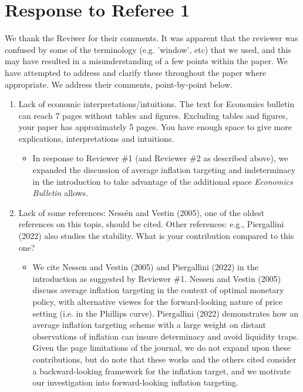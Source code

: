 \documentclass[english,authoryear,12pt]{elsarticle}
\begin{document}
\section*{Response to Referee 1}
We thank the Reviwer for their comments. It was apparent that the reviewer was confused by some of the terminology (e.g. 'window', etc) that we used, and this may have resulted in a misunderstanding of a few points within the paper. We have attempted to address and clarify these throughout the paper where appropriate. We address their comments, point-by-point below.

\begin{enumerate}
	\item Lack of economic interpretations/intuitions. The text for Economics bulletin can reach 7 pages without tables and figures. Excluding tables and figures, your paper has approximately 5 pages. You have enough space to give more explications, interpretations and intuitions.
	\begin{itemize}
		\item In response to Reviewer \#1 (and Reviewer \#2 as described above), we expanded the discussion of average inflation targeting and indeterminacy in the introduction to take advantage of the additional space \textit{Economics Bulletin} allows.
	\end{itemize}
	\item Lack of some references: Nessén and Vestin (2005), one of the oldest references on this topis, should be cited. Other references: e.g., Piergallini (2022) also studies the stability. What is your contribution compared to this one?  
	\begin{itemize}
		\item We cite Nessen and Vestin (2005) and Piergallini (2022) in the introduction as suggested by Reviewer \#1. Nessen and Vestin (2005)  discuss average inflation targeting in the context of optimal monetary policy, with alternative viewes for the forward-looking nature of price setting (i.e. in the Phillips curve). Piergallini (2022) demonstrates how an average inflation targeting scheme with a large weight on distant observations of inflation can insure determinacy and avoid liquidity traps. Given the page limitations of the journal, we do not expand upon these contributions, but do note that these works and the others cited consider a backward-looking framework for the inflation target, and we motivate our investigation into forward-looking inflation targeting.
	\end{itemize}

\end{enumerate}
\end{document}
